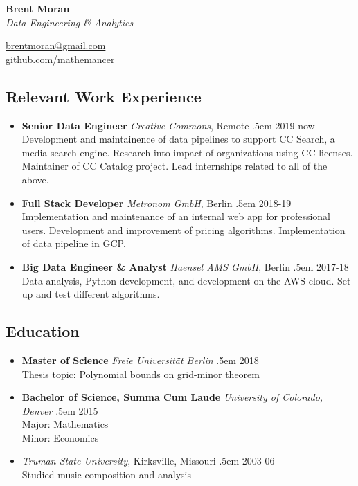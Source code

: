 \documentclass[a4paper]{article}
\makeatletter
\newcommand \brentfill {
  \tiny
  \leavevmode \cleaders 
  \hb@xt@ .5em{\hss \textperiodcentered \hss }\hfill \kern \z@
  \normalsize
}
\newcommand{\bbull}{\ding{118}}
\makeatother
\begin{document}
\noindent
\begin{minipage}[b][1cm]{.7\textwidth}
  \Huge\textbf{Brent Moran} \\
  \normalsize\emph{Data Engineering \& Analytics}
\end{minipage}
\begin{minipage}[b][1cm]{.4\textwidth}
  \raggedleft
  \ttfamily
  \href{mailto:brentmoran@gmail.com}{brentmoran@gmail.com} \\
  \href{https://github.com/mathemancer}{github.com/mathemancer}
\end{minipage}

\subsection*{Relevant Work Experience \hrulefill}

\begin{itemize}
  \item[\bbull] \textbf{Senior Data Engineer} \emph{Creative Commons},
    Remote \brentfill{} 2019-now\\
    Development and maintainence of data pipelines to support CC Search, a media
    search engine.  Research into impact of organizations using CC licenses.
    Maintainer of CC Catalog project.  Lead internships related to all of the
    above.
  \item[\bbull] \textbf{Full Stack Developer} \emph{Metronom GmbH},
    Berlin \brentfill{} 2018-19\\
    Implementation and maintenance of an internal web app for professional
    users. Development and improvement of pricing algorithms. Implementation of
    data pipeline in GCP.
  \item[\bbull] \textbf{Big Data Engineer \& Analyst} \emph{Haensel AMS
    GmbH}, Berlin \brentfill{} 2017-18\\
    Data analysis, Python development, and development on the AWS cloud.
    Set up and test different algorithms.
\end{itemize}

\subsection*{Education \hrulefill}
\begin{itemize}
  \item[\bbull] \textbf{Master of Science} \emph{Freie
    Universit\"at Berlin} \brentfill{} 2018\\
    Thesis topic:  Polynomial bounds on grid-minor theorem
  \item[\bbull] \textbf{Bachelor of Science, Summa Cum Laude} \emph{University
      of Colorado, Denver} \brentfill{} 2015\\
    Major:  Mathematics \\
    Minor: Economics
  \item[\bbull] \emph{Truman State University}, Kirksville,
    Missouri \brentfill{} 2003-06\\
    Studied music composition and analysis
\end{itemize}
\end{document}
